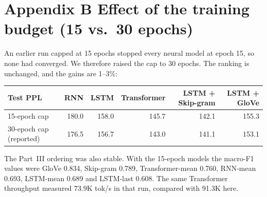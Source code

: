 \documentclass[10pt,a4paper]{article}
\begin{document}
\section*{Appendix B \quad Effect of the training budget (15 vs.\ 30 epochs)}
{\small An earlier run capped at 15 epochs stopped every neural model at epoch 15, so none had converged. We therefore raised the cap to 30 epochs. The ranking is unchanged, and the gains are 1--3\%:}
\begin{table}[h]
\centering\small
\begin{tabular}{lrrrrr}
\toprule
Test PPL & RNN & LSTM & Transformer & LSTM + Skip-gram & LSTM + GloVe \\
\midrule
15-epoch cap & 180.0 & 158.0 & 145.7 & 142.1 & 155.3 \\
30-epoch cap (reported) & 176.5 & 156.7 & 143.0 & 141.1 & 153.1 \\
\bottomrule
\end{tabular}
\end{table}
{\small The Part~III ordering was also stable. With the 15-epoch models the macro-F1 values were GloVe 0.834, Skip-gram 0.789, Transformer-mean 0.760, RNN-mean 0.693, LSTM-mean 0.689 and LSTM-last 0.608. The same Transformer throughput measured 73.9K tok/s in that run, compared with 91.3K here.}
\end{document}
